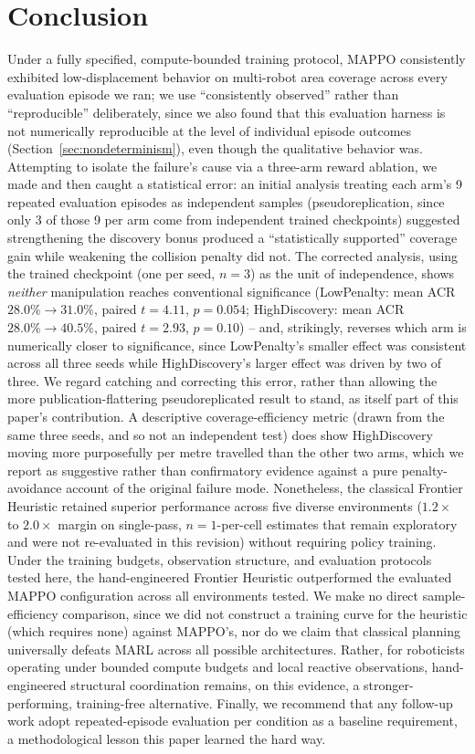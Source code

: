 \documentclass[11pt]{article}
\begin{document}
\section{Conclusion}
Under a fully specified, compute-bounded training protocol, MAPPO
consistently exhibited low-displacement behavior on multi-robot area
coverage across every evaluation episode we ran; we use ``consistently
observed'' rather than ``reproducible'' deliberately, since we also found
that this evaluation harness is not numerically reproducible at the level
of individual episode outcomes (Section~\ref{sec:nondeterminism}), even
though the qualitative behavior was. Attempting to isolate the failure's
cause via a three-arm reward ablation, we made and then caught a
statistical error: an initial analysis treating each arm's 9 repeated
evaluation episodes as independent samples (pseudoreplication, since only
3 of those 9 per arm come from independent trained checkpoints) suggested
strengthening the discovery bonus produced a ``statistically supported''
coverage gain while weakening the collision penalty did not. The
corrected analysis, using the trained checkpoint (one per seed, $n=3$) as
the unit of independence, shows \emph{neither} manipulation reaches
conventional significance (LowPenalty: mean ACR $28.0\%\to31.0\%$,
paired $t=4.11$, $p=0.054$; HighDiscovery: mean ACR $28.0\%\to40.5\%$,
paired $t=2.93$, $p=0.10$) -- and, strikingly, reverses which arm is
numerically closer to significance, since LowPenalty's smaller effect was
consistent across all three seeds while HighDiscovery's larger effect was
driven by two of three. We regard catching and correcting this error,
rather than allowing the more publication-flattering pseudoreplicated
result to stand, as itself part of this paper's contribution. A
descriptive coverage-efficiency metric (drawn from the same three seeds,
and so not an independent test) does show HighDiscovery moving more
purposefully per metre travelled than the other two arms, which we
report as suggestive rather than confirmatory evidence against a pure
penalty-avoidance account of the original failure mode.
Nonetheless, the classical Frontier Heuristic retained superior performance
across five diverse environments ($1.2\times$ to $2.0\times$ margin on
single-pass, $n{=}1$-per-cell estimates that remain exploratory and were
not re-evaluated in this revision) without requiring policy training.
Under the training budgets, observation structure, and evaluation protocols
tested here, the hand-engineered Frontier Heuristic outperformed the evaluated
MAPPO configuration across all environments tested. We make no direct
sample-efficiency comparison, since we did not construct a training curve for
the heuristic (which requires none) against MAPPO's, nor do we claim that
classical planning universally defeats MARL across all possible architectures.
Rather, for roboticists operating under bounded compute budgets and local
reactive observations, hand-engineered structural coordination remains, on
this evidence, a stronger-performing, training-free alternative. Finally, we
recommend that any follow-up work adopt repeated-episode evaluation per
condition as a baseline requirement, a methodological lesson this paper
learned the hard way.
\end{document}
